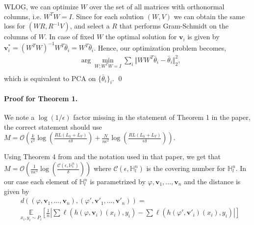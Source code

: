 \documentclass{article}
\newcommand{\bv}{\boldsymbol{v}}
\begin{document}
WLOG, we can optimize $W$ over the set of all matrices with orthonormal columns, i.e. $W^TW=I$. Since for each solution $(W,V)$ we can obtain the same loss for $(WR,R^{-1}V)$, and select a $R$ that performs Gram-Schmidt on the columns of $W$. In case of fixed $W$ the optimal solution for $
\bv_i$ is given by $\bv_i^*=(W^TW)^{-1}W^T\bar{\theta}_i=W^T\bar{\theta}_i$. Hence, our optimization problem becomes,
\begin{align*}
    &\arg\min_{W; W^TW=I} \sum_i \Vert WW^T\bar{\theta}_i - \bar{\theta}_i\Vert_2^2,\\
\end{align*}
which is equivalent to PCA on $\{\bar{\theta}_i\}_i$.
\qed


\paragraph{Proof for Theorem 1.}
We note a $\log(1/\epsilon)$ factor missing in the statement of Theorem 1 in the paper, the correct statement should use $M=\mathcal{O}\left(\frac{k}{\epsilon^2}\log\left(\frac{RL(L_h+L_V)}{\epsilon\delta}\right)+\frac{N}{n\epsilon^2}\log\left(\frac{RL(L_h+L_V)}{\epsilon\delta}\right)\right)$.

Using Theorem 4 from \cite{baxter2000model} and the notation used in that paper, we get that $M=\mathcal{O}\left(\frac{1}{n\epsilon^2}\log\left(\frac{\mathcal{C}(\epsilon,\mathds{H}^n_l)}{\delta}\right)\right)$ where $\mathcal{C}(\epsilon,\mathds{H}^n_l)$ is the covering number for $\mathds{H}^n_l$. In our case each element of $\mathds{H}^n_l$ is parametrized by $\varphi,\bv_1,...,\bv_n$ and the distance is given by 
{\small
\begin{align}
    &d((\varphi,\bv_1,...,\bv_n),(\varphi',\bv'_1,...,\bv'_n))=\\
    &\underset{x_i,y_i\sim P_i}{\mathds{E}}\left[\frac{1}{n}\left|\sum \ell(h(\varphi,\bv_i)(x_i),y_i)-\sum \ell(h(\varphi',\bv'_i)(x_i),y_i)\right|\right]\nonumber
\end{align}
}
\end{document}
